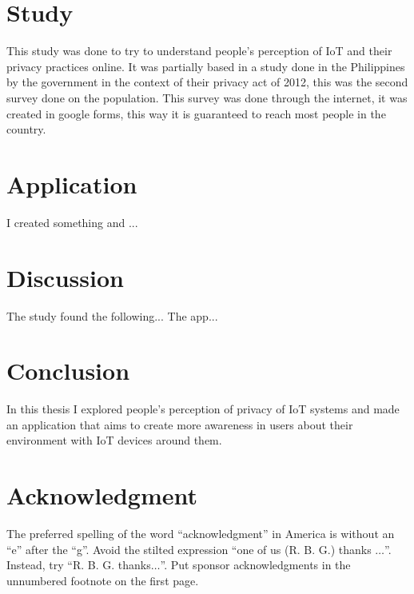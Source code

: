 \documentclass[conference]{IEEEtran}
\begin{document}
\section{Study}

This study was done to try to understand people's perception of IoT and their
privacy practices online. It was partially based in a study done in the Philippines by the
government in the context of their privacy act of 2012, this was the second survey done
on the population.
This survey was done through the internet, it was created in google forms, this way it
is guaranteed to reach most people in the country.

\section{Application}

I created something and ...

\section{Discussion}

The study found the following... The app...

\section{Conclusion}

In this thesis I explored people's perception of privacy of IoT systems and
made an application that aims to create more awareness in users about their
environment with IoT devices around them.

\section*{Acknowledgment}

The preferred spelling of the word ``acknowledgment'' in America is without
an ``e'' after the ``g''. Avoid the stilted expression ``one of us (R. B.
G.) thanks $\ldots$''. Instead, try ``R. B. G. thanks$\ldots$''. Put sponsor
acknowledgments in the unnumbered footnote on the first page.



\end{document}
